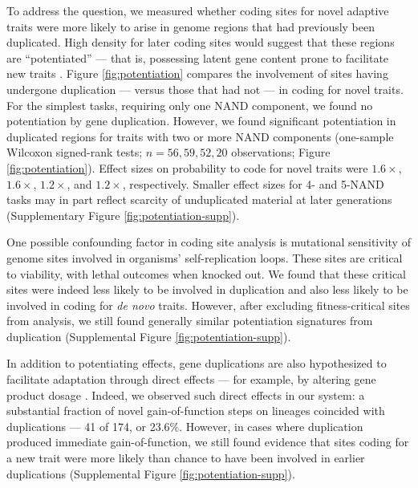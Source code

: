 To address the question, we measured whether coding sites for novel adaptive traits were more likely to arise in genome regions that had previously been duplicated.
High density for later coding sites would suggest that these regions are ``potentiated'' --- that is, possessing latent gene content prone to facilitate new traits \citep{Ferguson2023,Quandt2015,Blount2008}.
Figure \ref{fig:potentiation} compares the involvement of sites having undergone duplication --- versus those that had not --- in coding for novel traits.
For the simplest tasks, requiring only one NAND component, we found no potentiation by gene duplication.
However, we found significant potentiation in duplicated regions for traits with two or more NAND components (one-sample Wilcoxon signed-rank tests; $n=56,59,52,20$ observations; Figure \ref{fig:potentiation}).
Effect sizes on probability to code for novel traits were $1.6\times$, $1.6\times$, $1.2\times$, and $1.2\times$, respectively.
Smaller effect sizes for 4- and 5-NAND tasks may in part reflect scarcity of unduplicated material at later generations (Supplementary Figure \ref{fig:potentiation-supp}).

One possible confounding factor in coding site analysis is mutational sensitivity of genome sites involved in organisms' self-replication loops.
These sites are critical to viability, with lethal outcomes when knocked out.
We found that these critical sites were indeed less likely to be involved in duplication and also less likely to be involved in coding for \textit{de novo} traits.
However, after excluding fitness-critical sites from analysis, we still found generally similar potentiation signatures from duplication (Supplemental Figure \ref{fig:potentiation-supp}).

In addition to potentiating effects, gene duplications are also hypothesized to facilitate adaptation through direct effects --- for example, by altering gene product dosage \citep{kondrashov2012gene}.
Indeed, we observed such direct effects in our system: a substantial fraction of novel gain-of-function steps on lineages coincided with duplications --- 41 of 174, or 23.6\%.
However, in cases where duplication produced immediate gain-of-function, we still found evidence that sites coding for a new trait were more likely than chance to have been involved in earlier duplications (Supplemental Figure \ref{fig:potentiation-supp}).

